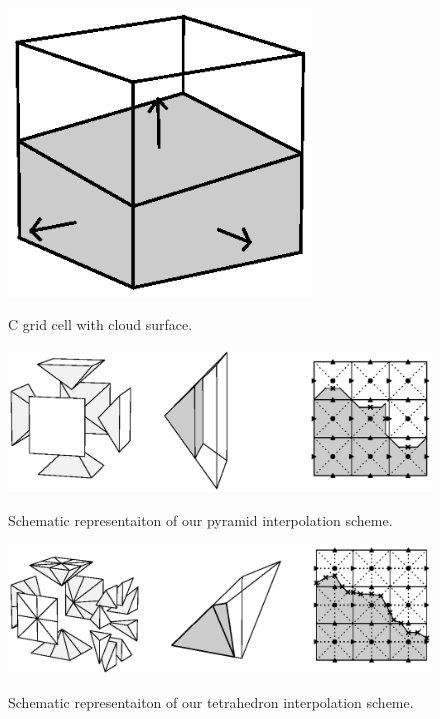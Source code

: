 \documentclass[12pt]{article}
\begin{document}
\begin{figure}[t]
  \noindent\includegraphics[width=19pc,angle=0]{./figures/cell_diagram.eps}\\
  \caption{C grid cell with cloud surface.}\label{fig:cell_diagram}
\end{figure}

\begin{figure}[t]
  \noindent\includegraphics[width=40pc,angle=0]{./figures/pyramid_scheme.eps}\\
  \caption{Schematic representaiton of our pyramid interpolation 
scheme.}\label{fig:pyramid_scheme}
\end{figure}

\begin{figure}[t]
  \noindent\includegraphics[width=40pc,angle=0]{./figures/tetrahedral_scheme.eps}\\
  \caption{Schematic representaiton of our tetrahedron interpolation 
scheme.}\label{fig:tetrahedral_scheme}
\end{figure}
\end{document}

